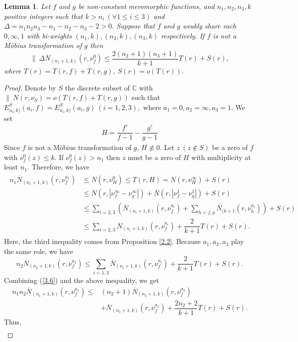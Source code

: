 \documentclass[12pt,leqno]{amsart}
\newtheorem{lemma}[equation]{Lemma}
\newcommand{\C}{{\mathbb{C}}}
\numberwithin{equation}{section}
\begin{document}
\begin{lemma}
Let $f$ and $g$ be non-constant meromorphic functions, and $n_1,n_2,n_3,k$ positive integers such that $k> n_i\ (\forall 1\le i\le 3)$ and $\Delta=n_1n_2n_3-n_1-n_2-n_3-2>0$. Suppose that $f$ and $g$ weakly share each $0,\infty,1$ with bi-weights $(n_1,k),(n_2,k),(n_3,k)$ respectively. If $f$ is not a M\"{o}bius transformation of $g$ then
$$\|\ \Delta\overline N_{(n_1+1,k)}(r,\nu^0_f)\le \frac{2(n_2+1)(n_3+1)}{k+1}T(r)+S(r),$$
where $T(r)=T(r,f)+T(r,g)$, $S(r)=o(T(r))$.
\end{lemma}
\begin{proof}
Denote by $S$ the discrete subset of $\C$ with $\|\ N(r,\nu_S)=o(T(r,f)+T(r,g))$ such that $E^S_{n_i,k)}(a_i,f)=E^S_{n_i,k)}(a_i,g)\ (i=1,2,3),$ where $a_1=0,a_2=\infty,a_3=1$. We set
\begin{align*}
H=\dfrac{f'}{f-1}-\dfrac{g'}{g-1}
\end{align*}
Since $f$ is not a M\"{o}bius transformation of $g$, $H\not\equiv 0$. Let $z\ (z\not\in S)$ be a zero of $f$ with $\nu^0_f(z)\le k$. If $\nu^0_f(z)> n_1$ then $z$ must be a zero of $H$ with multiplicity at least $n_1$. Therefore, we have
\begin{align}\label{3.6}
\begin{split}
n_1\overline N_{(n_1+1,k)}(r,\nu^{a_1}_f)&\le N(r,\nu^0_{H})\le T(r,H)=N(r,\nu^{\infty}_{H})+S(r)\\
&\leq \overline N(r,|\nu^{\infty}_f-\nu^{\infty}_g |)+\overline N(r,|\nu^{1}_f-\nu^{1}_g |)+S(r)\\
&\leq \sum_{i=2,3}(\overline N_{(n_i+1,k)}(r,\nu^{a_i}_{f})+\sum_{h=f,g}\overline N_{(k+1}(r,\nu^{a_i}_{h}))+S(r)\\
&\leq \sum_{i=2,3}\overline N_{(n_i+1,k)}(r,\nu^{a_i}_{f})+\dfrac{2}{k+1}T(r)+S(r).
\end{split}
\end{align}
Here, the third inequality comes from Proposition \ref{2.2}. Because $a_1,a_2,a_3$ play the same role, we have
$$n_2\overline N_{(n_2+1,k)}(r,\nu^{a_2}_f)\leq\sum_{i=1,3} \overline N_{(n_i+1,k)}(r,\nu^{a_i}_{f})+\dfrac{2}{k+1}T(r)+S(r).$$
Combining (\ref{3.6}) and the above inequality, we get
\begin{align*}
n_1n_2\overline N_{(n_1+1,k)}(r,\nu^{a_1}_f)\le&(n_2+1)\overline N_{(n_3+1,k)}(r,\nu^{a_3}_{f})\\
&+\overline N_{(n_1+1,k)}(r,\nu^{a_1}_{f})+\dfrac{2n_2+2}{k+1}T(r)+S(r).
\end{align*}
Thus,
\begin{align*}

\end{align*}
\end{proof}
\end{document}
